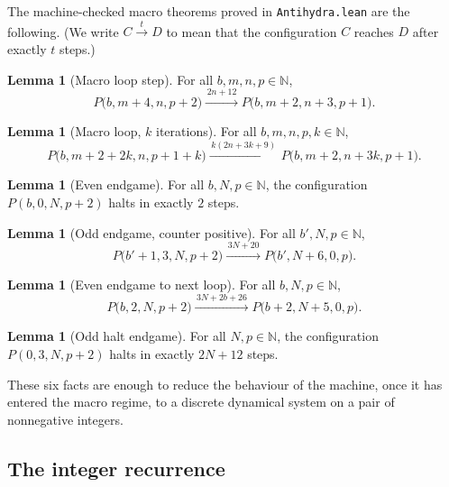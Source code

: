 \documentclass[11pt,a4paper]{article}
\theoremstyle{definition}
\newtheorem{lemma}[definition]{Lemma}
\newcommand{\Nat}{\mathbb{N}}
\begin{document}
The machine-checked macro theorems proved in \texttt{Antihydra.lean}
are the following.  (We write $C\xrightarrow{t}D$ to mean that the
configuration $C$ reaches $D$ after exactly $t$ steps.)

\begin{lemma}[Macro loop step]
  \label{lem:p-step}
  For all $b,m,n,p\in\Nat$,
  \[
    P\bigl(b,m+4,n,p+2\bigr)
    \xrightarrow{\,2n+12\,}
    P\bigl(b,m+2,n+3,p+1\bigr).
  \]
\end{lemma}

\begin{lemma}[Macro loop, $k$ iterations]
  \label{lem:p-multistep}
  For all $b,m,n,p,k\in\Nat$,
  \[
    P\bigl(b,m+2+2k,n,p+1+k\bigr)
    \xrightarrow{\,k(2n+3k+9)\,}
    P\bigl(b,m+2,n+3k,p+1\bigr).
  \]
\end{lemma}

\begin{lemma}[Even endgame]
  \label{lem:even-endgame}
  For all $b,N,p\in\Nat$, the configuration $P(b,0,N,p+2)$ halts in
  exactly $2$ steps.
\end{lemma}

\begin{lemma}[Odd endgame, counter positive]
  \label{lem:odd-endgame}
  For all $b',N,p\in\Nat$,
  \[
    P\bigl(b'+1,3,N,p+2\bigr)
    \xrightarrow{\,3N+20\,}
    P\bigl(b',N+6,0,p\bigr).
  \]
\end{lemma}

\begin{lemma}[Even endgame to next loop]
  \label{lem:even-to-loop}
  For all $b,N,p\in\Nat$,
  \[
    P\bigl(b,2,N,p+2\bigr)
    \xrightarrow{\,3N+2b+26\,}
    P\bigl(b+2,N+5,0,p\bigr).
  \]
\end{lemma}

\begin{lemma}[Odd halt endgame]
  \label{lem:odd-halt}
  For all $N,p\in\Nat$, the configuration $P(0,3,N,p+2)$ halts in
  exactly $2N+12$ steps.
\end{lemma}

These six facts are enough to reduce the behaviour of the machine,
once it has entered the macro regime, to a discrete dynamical system on
a pair of nonnegative integers.

\subsection{The integer recurrence}
\label{subsec:recurrence}
\end{document}
